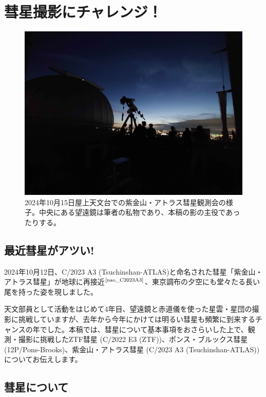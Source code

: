 \documentclass[../../super_nova_2024]{subfiles}
\begin{document}
\chapter{彗星撮影にチャレンジ！} %

\begin{figure}
  \centering
  \includegraphics[width=\textwidth]{img/DSC_2704.jpg}
  \caption{2024年10月15日屋上天文台での紫金山・アトラス彗星観測会の様子。中央にある望遠鏡は筆者の私物であり、本稿の影の主役であったりする。}
\end{figure}
\section{最近彗星がアツい!}

2024年10月12日、C/2023 A3 (Tsuchinshan-ATLAS)と命名された彗星「紫金山・アトラス彗星」が地球に再接近$^\text{\cite{nao_C2023A3}}$、東京調布の夕空にも堂々たる長い尾を持った姿を現しました。

天文部員として活動をはじめて4年目、望遠鏡と赤道儀を使った星雲・星団の撮影に挑戦していますが、去年から今年にかけては明るい彗星も頻繁に到来するチャンスの年でした。本稿では、彗星について基本事項をおさらいした上で、観測・撮影に挑戦したZTF彗星 (C/2022 E3 (ZTF))、ポンス・ブルックス彗星 (12P/Pons-Brooks)、紫金山・アトラス彗星 (C/2023 A3 (Tsuchinshan-ATLAS))についてお伝えします。

\section{彗星について}
\end{document}
